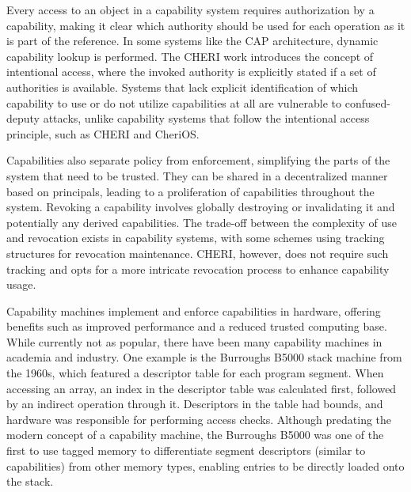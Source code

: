 Every access to an object in a capability system requires authorization by a capability, making 
it clear which authority should be used for each operation as it is part of the reference. 
In some systems like the CAP architecture, dynamic capability lookup is performed. 
The CHERI work introduces the concept of intentional access, where the invoked authority 
is explicitly stated if a set of authorities is available. Systems that lack explicit 
identification of which capability to use or do not utilize capabilities at all are 
vulnerable to confused-deputy attacks, unlike capability systems that follow the 
intentional access principle, such as CHERI and CheriOS.

Capabilities also separate policy from enforcement, simplifying the parts of the 
system that need to be trusted. They can be shared in a decentralized manner 
based on principals, leading to a proliferation of capabilities throughout 
the system. Revoking a capability involves globally destroying or invalidating 
it and potentially any derived capabilities. The trade-off between the complexity 
of use and revocation exists in capability systems, with some schemes using 
tracking structures for revocation maintenance. CHERI, however, does not require 
such tracking and opts for a more intricate revocation process to enhance capability usage.



Capability machines implement and enforce capabilities in hardware, 
offering benefits such as improved performance and a reduced trusted 
computing base. While currently not as popular, there have been many 
capability machines in academia and industry. One example is the Burroughs B5000 
stack machine from the 1960s, which featured a descriptor table for each program segment. 
When accessing an array, an index in the descriptor table was calculated first, 
followed by an indirect operation through it. Descriptors in the table had bounds,
 and hardware was responsible for performing access checks. Although predating the 
 modern concept of a capability machine, the Burroughs B5000 was one of the first 
 to use tagged memory to differentiate segment descriptors (similar to capabilities) 
 from other memory types, enabling entries to be directly loaded onto the stack.

